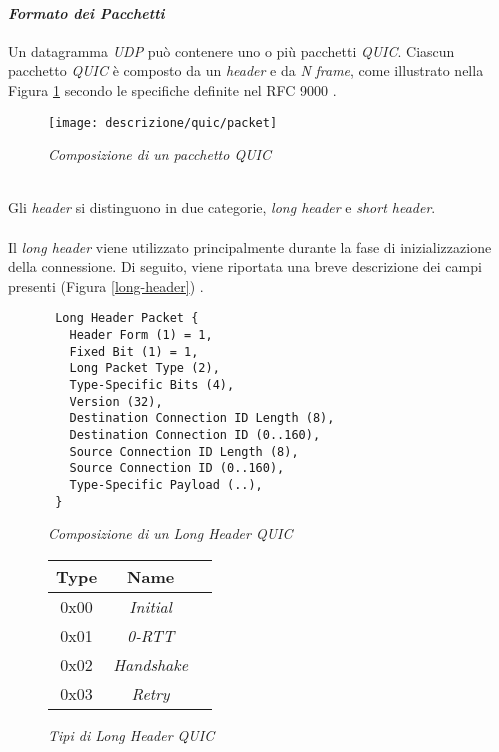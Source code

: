 \paragraph{\textit{Formato dei Pacchetti}}
\noindent Un datagramma \emph{UDP} può contenere uno o più pacchetti \emph{QUIC}. Ciascun pacchetto \emph{QUIC} è composto da un \emph{header} e da \emph{N} \emph{frame}, come illustrato nella Figura \ref{quic-packet} secondo le specifiche definite nel RFC 9000 \cite{site:rfc9000}.
\begin{figure}[!h]
    \centering
    \texttt{[image: descrizione/quic/packet]}
    \caption{\emph{Composizione di un pacchetto QUIC}}
    \label{quic-packet}
\end{figure}
\\
Gli \emph{header} si distinguono in due categorie, \emph{long header} e \emph{short header}. 
\\\\
Il \emph{long header} viene utilizzato principalmente durante la fase di inizializzazione della connessione. 
Di seguito, viene riportata una breve descrizione dei campi presenti (Figura \ref{long-header}) \cite{site:rfc9000}.
\begin{figure}[!h]
    \centering
    \begin{minipage}{0.48\textwidth}
        \centering
        \begin{small}
        \begin{BVerbatim}
 Long Header Packet {
   Header Form (1) = 1,
   Fixed Bit (1) = 1,
   Long Packet Type (2),
   Type-Specific Bits (4),
   Version (32),
   Destination Connection ID Length (8),
   Destination Connection ID (0..160),
   Source Connection ID Length (8),
   Source Connection ID (0..160),
   Type-Specific Payload (..),
 }
        \end{BVerbatim}
    \end{small}
        \caption{\emph{Composizione di un Long Header QUIC}}
        \label{long-header}
    \end{minipage}
    \hfill
    \begin{minipage}{0.48\textwidth}
        \centering
        \begin{tabular}{|c|c|c|}
            \hline
            \textbf{Type} & \textbf{Name}  \\
            \hline
            0x00 & \emph{Initial} \\
            \hline
            0x01 & \emph{0-RTT}  \\
            \hline
            0x02 & \emph{Handshake}   \\
            \hline
            0x03 & \emph{Retry}  \\
            \hline
            \end{tabular}
        \caption{\emph{Tipi di Long Header QUIC}}
        \label{packet-type}
    \end{minipage}
\end{figure}

